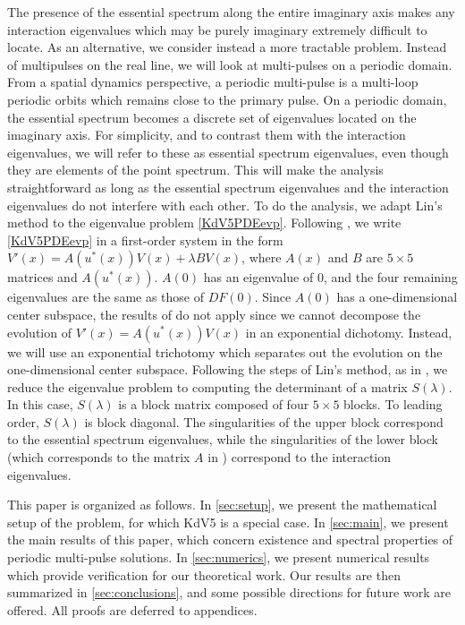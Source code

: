 \documentclass[11pt,reqno]{amsart}
\theoremstyle{plain}
\theoremstyle{definition}
\theoremstyle{remark}
\begin{document}
The presence of the essential spectrum along the entire imaginary axis makes any interaction eigenvalues which may be purely imaginary extremely difficult to locate. As an alternative, we consider instead a more tractable problem. Instead of multipulses on the real line, we will look at multi-pulses on a periodic domain. From a spatial dynamics perspective, a periodic multi-pulse is a multi-loop periodic orbits which remains close to the primary pulse. On a periodic domain, the essential spectrum becomes a discrete set of eigenvalues located on the imaginary axis. For simplicity, and to contrast them with the interaction eigenvalues, we will refer to these as essential spectrum eigenvalues, even though they are elements of the point spectrum. This will make the analysis straightforward as long as the essential spectrum eigenvalues and the interaction eigenvalues do not interfere with each other. To do the analysis, we adapt Lin's method to the eigenvalue problem \cref{KdV5PDEevp}. Following \cite{Sandstede1998}, we write \cref{KdV5PDEevp} in a first-order system in the form $V'(x) = A(u^*(x)) V(x) + \lambda B V(x)$, where $A(x)$ and $B$ are $5 \times 5$ matrices and $A(u^*(x))$. $A(0)$ has an eigenvalue of 0, and the four remaining eigenvalues are the same as those of $DF(0)$. Since $A(0)$ has a one-dimensional center subspace, the results of \cite{Sandstede1998} do not apply since we cannot decompose the evolution of $V'(x) = A(u^*(x))V(x)$ in an exponential dichotomy. Instead, we will use an exponential trichotomy which separates out the evolution on the one-dimensional center subspace. Following the steps of Lin's method, as in \cite{Sandstede1998}, we reduce the eigenvalue problem to computing the determinant of a matrix $S(\lambda)$. In this case, $S(\lambda)$ is a block matrix composed of four $5 \times 5$ blocks. To leading order, $S(\lambda)$ is block diagonal. The singularities of the upper block correspond to the essential spectrum eigenvalues, while the singularities of the lower block (which corresponds to the matrix $A$ in \cite[Theorem 2]{Sandstede1998}) correspond to the interaction eigenvalues. 

This paper is organized as follows. In \cref{sec:setup}, we present the mathematical setup of the problem, for which KdV5 is a special case. In \cref{sec:main}, we present the main results of this paper, which concern existence and spectral properties of periodic multi-pulse solutions. In \cref{sec:numerics}, we present numerical results which provide verification for our theoretical work. Our results are then summarized in \cref{sec:conclusions}, and some possible directions for future work are offered. All proofs are deferred to appendices.
\end{document}
